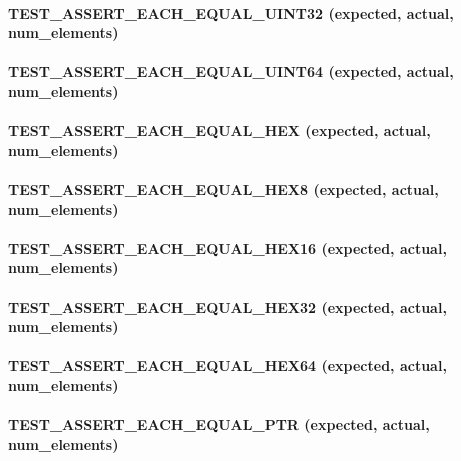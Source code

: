 \paragraph*{{\ttfamily T\+E\+S\+T\+\_\+\+A\+S\+S\+E\+R\+T\+\_\+\+E\+A\+C\+H\+\_\+\+E\+Q\+U\+A\+L\+\_\+\+U\+I\+N\+T32 (expected, actual, num\+\_\+elements)}}

\paragraph*{{\ttfamily T\+E\+S\+T\+\_\+\+A\+S\+S\+E\+R\+T\+\_\+\+E\+A\+C\+H\+\_\+\+E\+Q\+U\+A\+L\+\_\+\+U\+I\+N\+T64 (expected, actual, num\+\_\+elements)}}

\paragraph*{{\ttfamily T\+E\+S\+T\+\_\+\+A\+S\+S\+E\+R\+T\+\_\+\+E\+A\+C\+H\+\_\+\+E\+Q\+U\+A\+L\+\_\+\+H\+EX (expected, actual, num\+\_\+elements)}}

\paragraph*{{\ttfamily T\+E\+S\+T\+\_\+\+A\+S\+S\+E\+R\+T\+\_\+\+E\+A\+C\+H\+\_\+\+E\+Q\+U\+A\+L\+\_\+\+H\+E\+X8 (expected, actual, num\+\_\+elements)}}

\paragraph*{{\ttfamily T\+E\+S\+T\+\_\+\+A\+S\+S\+E\+R\+T\+\_\+\+E\+A\+C\+H\+\_\+\+E\+Q\+U\+A\+L\+\_\+\+H\+E\+X16 (expected, actual, num\+\_\+elements)}}

\paragraph*{{\ttfamily T\+E\+S\+T\+\_\+\+A\+S\+S\+E\+R\+T\+\_\+\+E\+A\+C\+H\+\_\+\+E\+Q\+U\+A\+L\+\_\+\+H\+E\+X32 (expected, actual, num\+\_\+elements)}}

\paragraph*{{\ttfamily T\+E\+S\+T\+\_\+\+A\+S\+S\+E\+R\+T\+\_\+\+E\+A\+C\+H\+\_\+\+E\+Q\+U\+A\+L\+\_\+\+H\+E\+X64 (expected, actual, num\+\_\+elements)}}

\paragraph*{{\ttfamily T\+E\+S\+T\+\_\+\+A\+S\+S\+E\+R\+T\+\_\+\+E\+A\+C\+H\+\_\+\+E\+Q\+U\+A\+L\+\_\+\+P\+TR (expected, actual, num\+\_\+elements)}}


